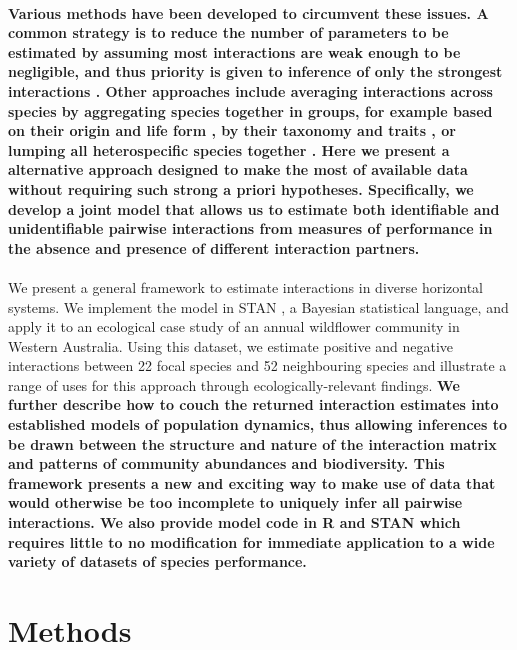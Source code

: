 \documentclass[a4,12pt]{article}
\begin{document}
\begin{refsection}
    \paragraph{}
    \textbf{Various methods have been developed to circumvent these issues. A common strategy is to reduce the number of parameters to be estimated by assuming most interactions are weak enough to be negligible, and thus priority is given to inference of only the strongest interactions \parencite{Weiss-Lehman2022}. Other approaches include averaging interactions across species by aggregating species together in groups, for example based on their origin and life form \parencite{Martyn2021}, by their taxonomy and traits \parencite{Uriarte2004}, or lumping all heterospecific species together \parencite{Chu2015}. Here we present a alternative approach designed to make the most of available data without requiring such strong a priori hypotheses. Specifically, we develop a joint model that allows us to estimate both identifiable and unidentifiable pairwise interactions from measures of performance in the absence and presence of different interaction partners.}

    \paragraph{} 
    We present a general framework to estimate interactions in diverse horizontal systems. We implement the model in STAN \parencite{Carpenter2017}, a Bayesian statistical language, and apply it to an ecological case study of an annual wildflower community in Western Australia. Using this dataset, we estimate positive and negative interactions between 22 focal species and 52 neighbouring species and illustrate a range of uses for this approach through ecologically-relevant findings. \textbf{We further describe how to couch the returned interaction estimates into established models of population dynamics, thus allowing inferences to be drawn between the structure and nature of the interaction matrix and patterns of community abundances and biodiversity. This framework presents a new and exciting way to make use of data that would otherwise be too incomplete to uniquely infer all pairwise interactions. We also provide model code in R and STAN which requires little to no modification for immediate application to a wide variety of datasets of species performance.}


\section{Methods}


\end{refsection}
\end{document}
